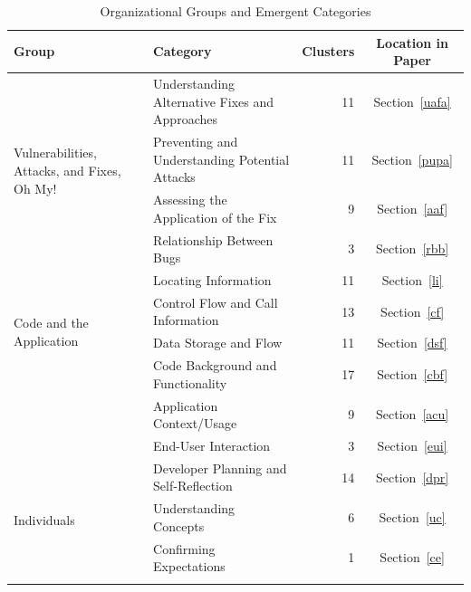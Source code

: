 \documentclass{acm_proc_article-sp}
\begin{document}
\begin{table} 
\centering
\caption{Organizational Groups and Emergent Categories}
\begin{tabular}{|l|l|r|c|}
\rowcolor{gray!50}
\hline
    Group											& Category										& Clusters		& Location in Paper	  	\\
    \hline			
    \multirow{4}{*}{Vulnerabilities, Attacks, and Fixes, Oh My!}
        											& Understanding Alternative Fixes and Approaches	& 11     		& Section~\ref{uafa}	\\

    												& Preventing and Understanding Potential Attacks	& 11     		& Section~\ref{pupa}		\\

    												& Assessing the Application of the Fix				& 9     		& Section~\ref{aaf}				\\

    												& Relationship Between Bugs							& 3     		& Section~\ref{rbb}			\\
    \hline
    \multirow{4}{*}{Code and the Application}	
    												& Locating Information 								& 11      		& Section~\ref{li}		\\

    												& Control Flow and Call Information					& 13     		& Section~\ref{cf}	\\

    												& Data Storage and Flow								& 11     		& Section~\ref{dsf}  	\\

    												& Code Background and Functionality	 				& 17     		& Section~\ref{cbf}			\\

    									& Application Context/Usage										& 9     		& Section~\ref{acu}			\\

    									& End-User Interaction											& 3     		& Section~\ref{eui}		\\
    \hline	
    \multirow{4}{*}{Individuals}	
    									& Developer Planning and Self-Reflection						& 14    		& Section~\ref{dpr}		\\

    									& Understanding Concepts										& 6 			& Section~\ref{uc}			\\

    									& Confirming Expectations					 					& 1				& Section~\ref{ce}  \\
    \hline
	\multirow{4}{*}{Problem Solving Support}


\end{tabular}
\end{table}
\end{document}
